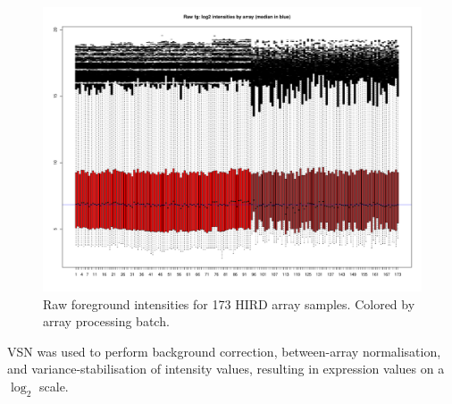 \begin{figure}
    \centering
    \includegraphics[width=1.0\textwidth,page=1]{mainmatter/figures/chapter_02/array_data_setup.array_intensity_boxplots.pdf}
    \caption{Raw foreground intensities for 173 \gls{HIRD} array samples. Colored by array processing batch.}
    \label{fig:hird_array_boxplots_raw}
\end{figure}

VSN\autocite{huber2002VarianceStabilizationApplied} was used to perform background correction, between-array normalisation, and variance-stabilisation of intensity values, resulting in expression values on a $\log_2$ scale.

